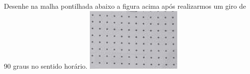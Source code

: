 \documentclass[a4paper,14pt]{article}
\begin{document}
\begin{multicols}{2}
\begin{enumerate}
        	Desenhe na malha pontilhada abaixo a figura acima após realizarmos um giro de 90 graus no sentido horário.
        	\includegraphics[width=1\linewidth]{1MMA01_imagens/imagem08}
    	\end{enumerate}
	\end{multicols}
\end{document}
